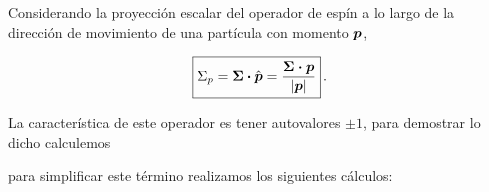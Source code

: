 Considerando la proyección escalar del operador de espín a lo largo de la dirección de movimiento de una partícula con momento $\vb*{p}$, 

\newcommand{\prp}{\vdot}

\begin{equation}
	\boxed{ \Sigma_p = \vb*{\Sigma} \prp \hat{ \vb*{p} } = \frac{\vb*{\Sigma \prp \vb*{p} }}{ \abs{ \vb*{p} } }  }\, .
\end{equation}

La característica de este operador es tener autovalores $\pm 1$, para demostrar lo dicho calculemos


para simplificar este término realizamos los siguientes cálculos: 

